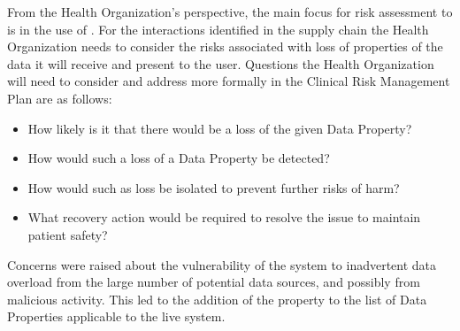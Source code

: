 \begin{minipage}[t]{0.73\textwidth}
  From the Health Organization's perspective, the main focus for risk assessment to  is in the use of . For the interactions identified in the supply chain the Health Organization needs to consider the risks associated with loss of properties of the data it will receive and present to the user. Questions the Health Organization will need to consider and address more formally in the Clinical Risk Management Plan are as follows:
\end{minipage}
\begin{minipage}[t]{0.25\textwidth}
  \centering{}
\end{minipage}

\begin{itemize}
  \item How likely is it that there would be a loss of the given Data Property?
  \item How would such a loss of a Data Property be detected?
  \item How would such as loss be isolated to prevent further risks of harm?
  \item What recovery action would be required to resolve the issue to maintain patient safety?
\end{itemize}

Concerns were raised about the vulnerability of the system to inadvertent data overload from the large number of potential data sources, and possibly from malicious activity. This led to the addition of the  property to the list of Data Properties applicable to the live system.

